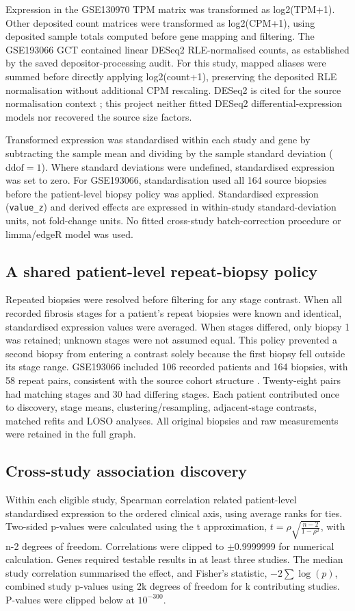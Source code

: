 \documentclass[11pt,a4paper]{article}
\begin{document}
Expression in the GSE130970 TPM matrix was transformed as log2(TPM+1). Other deposited count matrices were transformed as log2(CPM+1), using deposited sample totals computed before gene mapping and filtering. The GSE193066 GCT contained linear DESeq2 RLE-normalised counts, as established by the saved depositor-processing audit. For this study, mapped aliases were summed before directly applying log2(count+1), preserving the deposited RLE normalisation without additional CPM rescaling. DESeq2 is cited for the source normalisation context \cite{ref9}; this project neither fitted DESeq2 differential-expression models nor recovered the source size factors.

Transformed expression was standardised within each study and gene by subtracting the sample mean and dividing by the sample standard deviation (\(\mathrm{ddof}=1\)). Where standard deviations were undefined, standardised expression was set to zero. For GSE193066, standardisation used all 164 source biopsies before the patient-level biopsy policy was applied. Standardised expression (\texttt{value\_z}) and derived effects are expressed in within-study standard-deviation units, not fold-change units. No fitted cross-study batch-correction procedure or limma/edgeR model was used.

\subsection*{A shared patient-level repeat-biopsy policy}
Repeated biopsies were resolved before filtering for any stage contrast. When all recorded fibrosis stages for a patient's repeat biopsies were known and identical, standardised expression values were averaged. When stages differed, only biopsy 1 was retained; unknown stages were not assumed equal. This policy prevented a second biopsy from entering a contrast solely because the first biopsy fell outside its stage range. GSE193066 included 106 recorded patients and 164 biopsies, with 58 repeat pairs, consistent with the source cohort structure \cite{ref10}. Twenty-eight pairs had matching stages and 30 had differing stages. Each patient contributed once to discovery, stage means, clustering/resampling, adjacent-stage contrasts, matched refits and LOSO analyses. All original biopsies and raw measurements were retained in the full graph.

\subsection*{Cross-study association discovery}
Within each eligible study, Spearman correlation related patient-level standardised expression to the ordered clinical axis, using average ranks for ties. Two-sided p-values were calculated using the t approximation, \(t=\rho\sqrt{\frac{n-2}{1-\rho^2}}\), with n-2 degrees of freedom. Correlations were clipped to \ensuremath{\pm}0.9999999 for numerical calculation. Genes required testable results in at least three studies. The median study correlation summarised the effect, and Fisher's statistic, \(-2\sum\log(p)\), combined study p-values using 2k degrees of freedom for k contributing studies. P-values were clipped below at \(10^{-300}\).
\end{document}
